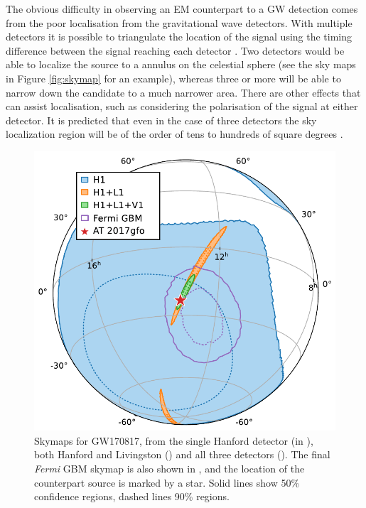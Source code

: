 \begin{colsection}
\begin{colsection}
The obvious difficulty in observing an EM counterpart to a GW detection comes from the poor localisation from the gravitational wave detectors. With multiple detectors it is possible to triangulate the location of the signal using the timing difference between the signal reaching each detector \citep{LIGO-localization,LIGO-localization2}. Two detectors would be able to localize the source to a annulus on the celestial sphere (see the sky maps in Figure \ref{fig:skymap} for an example), whereas three or more will be able to narrow down the candidate to a much narrower area. There are other effects that can assist localisation, such as considering the polarisation of the signal at either detector. It is predicted that even in the case of three detectors the sky localization region will be of the order of tens to hundreds of square degrees \citep{LIGO-prospects}.

\begin{figure}[p]
    \begin{center}
        \includegraphics[width=\linewidth]{images/skymaps.pdf}
    \end{center}
    \caption[Skymaps for GW170817]{
        Skymaps for GW170817, from the single Hanford detector (in ), both Hanford and Livingston () and all three detectors (). The final \textit{Fermi} GBM skymap is also shown in , and the location of the counterpart source is marked by a  star. Solid lines show 50\% confidence regions, dashed lines 90\% regions.
        }\label{fig:170817_skymaps}
\end{figure}


\end{colsection}
\end{colsection}
